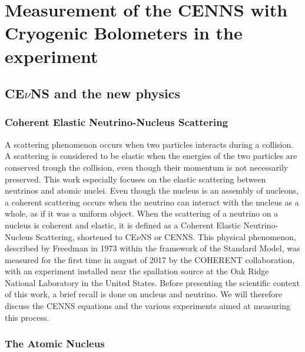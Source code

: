 
\chapter{Measurement of the CENNS with Cryogenic Bolometers in the \Ricochet{} experiment} %

\label{ChapterIntro} %


\section{CE$\nu$NS and the new physics}

\subsection{Coherent Elastic Neutrino-Nucleus Scattering}

A scattering phenomenon occurs when two particles interacts during a collision. A scattering is considered to be elastic when the energies of the two particles are conserved trough the collision, even though their momentum is not necessarily preserved. 
This work especially focuses on the elastic scattering between neutrinos and atomic nuclei. Even though the nucleus is an assembly of nucleons, a coherent scattering occurs when the neutrino can interact with the nucleus as a whole, as if it was a uniform object.
When the scattering of a neutrino on a nucleus is coherent and elastic, it is defined as a Coherent Elastic Neutrino-Nucleus Scattering, shortened to CE$\nu$NS or CENNS.
This physical phenomenon, described by Freedman in 1973 within the framework of the Standard Model, was  measured for the first time in august of 2017 by the COHERENT collaboration, with an experiment installed near the spallation source at the Oak Ridge National Laboratory in the United States.
Before presenting the scientific context of this work, a brief recall is done on nucleus and neutrino. We will therefore discuss the CENNS equations and the various experiments aimed at measuring this process.


\subsection{The Atomic Nucleus}

